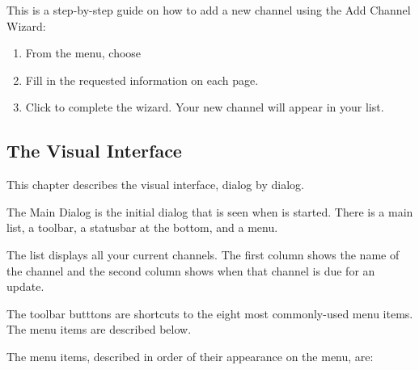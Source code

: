 This is a step-by-step guide on how to add a new channel using the Add Channel 
Wizard:
\begin{enumerate}
    \item From the menu, choose 

    \item Fill in the requested information on each page.

    \item Click  to complete the wizard. Your 
    new channel will appear in your list.
\end{enumerate}

\begin{helponly}
\chapter{The Visual Interface}\label{pd-visual-interface}
This chapter describes the \brandingapplicationdesktopname visual interface, dialog by dialog.
\end{helponly}


The Main Dialog is the initial dialog that is seen when \brandingapplicationdesktopname is  
started. There is a main list, a toolbar, a statusbar at the bottom, and a 
menu. 

The list displays all your current \brandingapplicationsuitename channels. The first column 
shows the name of the channel and the second column shows when that channel 
is due for an update. 

The toolbar butttons are shortcuts to the eight most commonly-used menu items.
The menu items are described below.


The menu items, described in order of their appearance on the menu, are:

